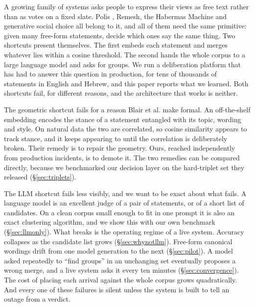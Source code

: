\documentclass{article}
\newcommand{\bpt}{Blair et al.\xspace}
\begin{document}
A growing family of systems asks people to express their views as free text rather than as votes on a fixed slate. Polis \citep{small2021polis}, Remesh, the Habermas Machine \citep{tessler2024ai} and generative social choice \citep{fish2026generative,boehmer2025generative} all belong to it, and all of them need the same primitive: given many free-form statements, decide which ones say the same thing. Two shortcuts present themselves. The first embeds each statement and merges whatever lies within a cosine threshold. The second hands the whole corpus to a large language model and asks for groups. We run a deliberation platform that has had to answer this question in production, for tens of thousands of statements in English and Hebrew, and this paper reports what we learned. Both shortcuts fail, for different reasons, and the architecture that works is neither.

The geometric shortcut fails for a reason \bpt \citeyearpar{blair2026embeddings} make formal. An off-the-shelf embedding encodes the stance of a statement entangled with its topic, wording and style. On natural data the two are correlated, so cosine similarity appears to track stance, and it keeps appearing to until the correlation is deliberately broken. Their remedy is to repair the geometry. Ours, reached independently from production incidents, is to demote it. The two remedies can be compared directly, because we benchmarked our decision layer on the hard-triplet set they released (\S\ref{sec:triplets}).

The LLM shortcut fails less visibly, and we want to be exact about what fails. A language model is an excellent judge of a pair of statements, or of a short list of candidates. On a clean corpus small enough to fit in one prompt it is also an exact clustering algorithm, and we show this with our own benchmark (\S\ref{sec:llmonly}). What breaks is the operating regime of a live system. Accuracy collapses as the candidate list grows (\S\ref{sec:whynotllm}). Free-form canonical wordings drift from one model generation to the next (\S\ref{sec:pilot}). A model asked repeatedly to ``find groups'' in an unchanging set eventually proposes a wrong merge, and a live system asks it every ten minutes (\S\ref{sec:convergence}). The cost of placing each arrival against the whole corpus grows quadratically. And every one of these failures is silent unless the system is built to tell an outage from a verdict.
\end{document}
